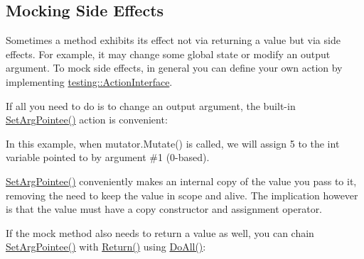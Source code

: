 \subsection*{Mocking Side Effects}

Sometimes a method exhibits its effect not via returning a value but via side effects. For example, it may change some global state or modify an output argument. To mock side effects, in general you can define your own action by implementing {\ttfamily \mbox{\hyperlink{classtesting_1_1ActionInterface}{testing\+::\+Action\+Interface}}}.

If all you need to do is to change an output argument, the built-\/in {\ttfamily \mbox{\hyperlink{namespacetesting_a5740a5033b88c37666fcd09a269d123f}{Set\+Arg\+Pointee()}}} action is convenient\+:


\begin{DoxyCode}{0}
\DoxyCodeLine{}
\DoxyCodeLine{\};}
\DoxyCodeLine{}
\end{DoxyCode}


In this example, when {\ttfamily mutator.\+Mutate()} is called, we will assign 5 to the {\ttfamily int} variable pointed to by argument \#1 (0-\/based).

{\ttfamily \mbox{\hyperlink{namespacetesting_a5740a5033b88c37666fcd09a269d123f}{Set\+Arg\+Pointee()}}} conveniently makes an internal copy of the value you pass to it, removing the need to keep the value in scope and alive. The implication however is that the value must have a copy constructor and assignment operator.

If the mock method also needs to return a value as well, you can chain {\ttfamily \mbox{\hyperlink{namespacetesting_a5740a5033b88c37666fcd09a269d123f}{Set\+Arg\+Pointee()}}} with {\ttfamily \mbox{\hyperlink{namespacetesting_af6d1c13e9376c77671e37545cd84359c}{Return()}}} using {\ttfamily \mbox{\hyperlink{namespacetesting_a5f533932753d2af95000e96c4a3042e3}{Do\+All()}}}\+:


\begin{DoxyCode}{0}
\DoxyCodeLine{}
\DoxyCodeLine{\};}
\DoxyCodeLine{}
\end{DoxyCode}


